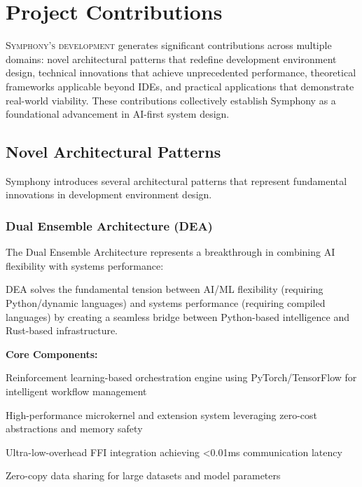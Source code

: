 
\section{Project Contributions}
\label{sec:project-contributions}

\lettrine{S}{ymphony's development} generates significant contributions across multiple domains: novel architectural patterns that redefine development environment design, technical innovations that achieve unprecedented performance, theoretical frameworks applicable beyond IDEs, and practical applications that demonstrate real-world viability. These contributions collectively establish Symphony as a foundational advancement in AI-first system design.

\subsection{Novel Architectural Patterns}
\label{subsec:novel-architectural-patterns}

Symphony introduces several architectural patterns that represent fundamental innovations in development environment design.

\subsubsection{Dual Ensemble Architecture (DEA)}

The Dual Ensemble Architecture represents a breakthrough in combining AI flexibility with systems performance:

\begin{infobox}[title=Architectural Innovation: Best of Both Worlds]
DEA solves the fundamental tension between AI/ML flexibility (requiring Python/dynamic languages) and systems performance (requiring compiled languages) by creating a seamless bridge between Python-based intelligence and Rust-based infrastructure.
\end{infobox}

\textbf{Core Components:}

\begin{description}[leftmargin=4cm,labelwidth=3.5cm]
    \item[\textbf{Python Conductor}] Reinforcement learning-based orchestration engine using PyTorch/TensorFlow for intelligent workflow management
    \item[\textbf{Rust Infrastructure}] High-performance microkernel and extension system leveraging zero-cost abstractions and memory safety
    \item[\textbf{PyO3 Bridge}] Ultra-low-overhead FFI integration achieving <0.01ms communication latency
    \item[\textbf{Shared Memory}] Zero-copy data sharing for large datasets and model parameters
\end{description}

